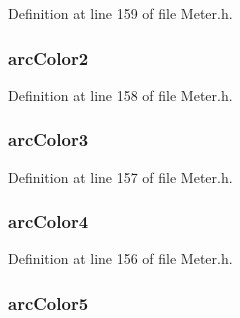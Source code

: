 Definition at line 159 of file Meter.\+h.

\hypertarget{struct_m_e_t_e_r_a8262f0e2fe448faf6944e5f8ccdba0ac}{}
\subsubsection[{arc\+Color2}]{ arc\+Color2}\label{struct_m_e_t_e_r_a8262f0e2fe448faf6944e5f8ccdba0ac}


Definition at line 158 of file Meter.\+h.

\hypertarget{struct_m_e_t_e_r_a1824b0ec484eb62094feadd7e169f78d}{}
\subsubsection[{arc\+Color3}]{ arc\+Color3}\label{struct_m_e_t_e_r_a1824b0ec484eb62094feadd7e169f78d}


Definition at line 157 of file Meter.\+h.

\hypertarget{struct_m_e_t_e_r_afd5b6bda1761046f32fe723529d1d849}{}
\subsubsection[{arc\+Color4}]{ arc\+Color4}\label{struct_m_e_t_e_r_afd5b6bda1761046f32fe723529d1d849}


Definition at line 156 of file Meter.\+h.

\hypertarget{struct_m_e_t_e_r_adb53152dff0da9b12db82ddd2fc5a203}{}
\subsubsection[{arc\+Color5}]{ arc\+Color5}\label{struct_m_e_t_e_r_adb53152dff0da9b12db82ddd2fc5a203}


